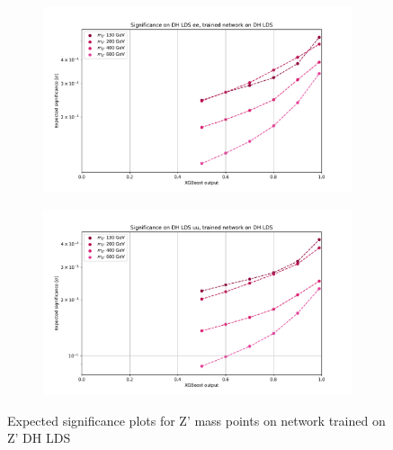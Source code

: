 \documentclass[12pt, a4paper]{book}
\begin{document}
\begin{figure}[!ht]
	\centering
	\begin{subfigure}[b]{0.49\textwidth}
      \centering
      \includegraphics[width=1\textwidth]{XGBoost/DH_LDS/EXP_SIG_ee.pdf}
      \end{subfigure}
   \hfill
   \begin{subfigure}[b]{0.49\textwidth}
      \centering
      \includegraphics[width=1\textwidth]{XGBoost/DH_LDS/EXP_SIG_uu.pdf}
      \end{subfigure}
   \caption{Expected significance plots for Z' mass points on network trained on Z' DH LDS}\label{fig:DH_LDS_exp_sig}
\end{figure}
\end{document}
